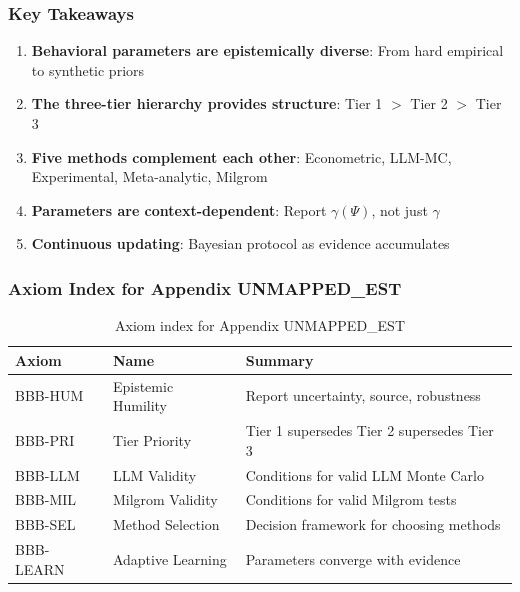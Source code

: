 \subsubsection{Key Takeaways}

\begin{enumerate}
    \item \textbf{Behavioral parameters are epistemically diverse}: From hard empirical to 
    synthetic priors
    \item \textbf{The three-tier hierarchy provides structure}: Tier 1 $>$ Tier 2 $>$ Tier 3
    \item \textbf{Five methods complement each other}: Econometric, LLM-MC, Experimental, 
    Meta-analytic, Milgrom
    \item \textbf{Parameters are context-dependent}: Report $\gamma(\Psi)$, not just $\gamma$
    \item \textbf{Continuous updating}: Bayesian protocol as evidence accumulates
\end{enumerate}

\subsubsection{Axiom Index for Appendix UNMAPPED_EST}

\begin{table}[h]
\centering
\small
\begin{tabular}{lll}
\toprule
\textbf{Axiom} & \textbf{Name} & \textbf{Summary} \\
\midrule
BBB-HUM & Epistemic Humility & Report uncertainty, source, robustness \\
BBB-PRI & Tier Priority & Tier 1 supersedes Tier 2 supersedes Tier 3 \\
BBB-LLM & LLM Validity & Conditions for valid LLM Monte Carlo \\
BBB-MIL & Milgrom Validity & Conditions for valid Milgrom tests \\
BBB-SEL & Method Selection & Decision framework for choosing methods \\
BBB-LEARN & Adaptive Learning & Parameters converge with evidence \\
\bottomrule
\end{tabular}
\caption{Axiom index for Appendix UNMAPPED_EST}
\label{tab:bbb-axioms}
\end{table}


